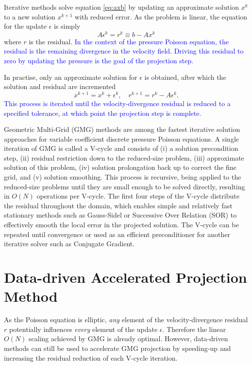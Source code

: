 \documentclass[]{elsarticle}
\begin{document}
Iterative methods solve equation \ref{eq:axb} by updating an approximate solution $x^k$ to a new solution $x^{k+1}$ with reduced error. As the problem is linear, the equation for the update $\epsilon$ is simply
\begin{equation}\label{eq:aer} 
    A \epsilon^k = r^k \equiv b - Ax^k
\end{equation}
where $r$ is the residual. \textcolor{blue}{In the context of the pressure Poisson equation, the residual is the remaining divergence in the velocity field. Driving this residual to zero by updating the pressure is the goal of the projection step.} 

In practise, only an approximate solution for $\epsilon$ is obtained, after which the solution and residual are incremented
\begin{equation}\label{eq:increment}
    x^{k+1} = x^k+\epsilon^k, \quad r^{k+1} = r^k-A\epsilon^k.
\end{equation}
\textcolor{blue}{This process is iterated until the velocity-divergence residual is reduced to a specified tolerance, at which point the projection step is complete.}

Geometric Multi-Grid (GMG) methods are among the fastest iterative solution approaches for variable coefficient discrete pressure Poisson equations. A single iteration of GMG is called a V-cycle and consists of (i) a solution precondition step, (ii) residual restriction down to the reduced-size problem, (iii) approximate solution of this problem, (iv) solution prolongation back up to correct the fine grid, and (v) solution smoothing. This process is recursive, being applied to the reduced-size problems until they are small enough to be solved directly, resulting in $O(N)$ operations per V-cycle.
The first four steps of the V-cycle distribute the residual throughout the domain, which enables simple and relatively fast stationary methods such as Gauss-Sidel or Successive Over Relation (SOR) to effectively smooth the local error in the projected solution. The V-cycle can be repeated until convergence or used as an efficient preconditioner for another iterative solver such as Conjugate Gradient. 

\section{Data-driven Accelerated Projection Method}

As the Poisson equation is elliptic, \textit{any} element of the velocity-divergence residual $r$ potentially influences \textit{every} element of the update $\epsilon$. Therefore the linear $O(N)$ scaling achieved by GMG is already optimal. However, data-driven methods can still be used to accelerate GMG projection by speeding-up and increasing the residual reduction of each V-cycle iteration.
\end{document}
